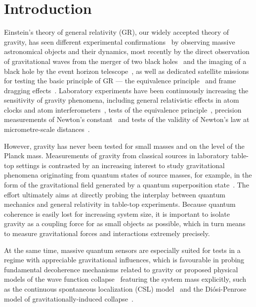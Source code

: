 \documentclass[pdflatex,sn-mathphys]{sn-jnl}
\begin{document}
\section{Introduction}\label{sec1}
    Einstein’s theory of general relativity (GR), our widely accepted theory of gravity, has seen different experimental confirmations~\cite{Einstein1916,walsh1979} by observing massive astronomical objects and their dynamics, most recently by the direct observation of gravitational waves from the merger of two black holes~\cite{abbott2016} and the imaging of a black hole by the event horizon telescope~\cite{akiyama2019}, as well as dedicated satellite missions for testing the basic principle of GR --- the equivalence principle~\cite{touboul2017} and frame dragging effects~\cite{everitt2011}. Laboratory experiments have been continuously increasing the sensitivity of gravity phenomena, including general relativistic effects in atom clocks and atom interferometers~\cite{bothwell2022,asenbaum2017}, tests of the equivalence principle~\cite{rosi2017,asenbaum2020}, precision measurements of Newton's constant~\cite{rosi2014,quinn2013} and tests of the validity of Newton's law at micrometre-scale distances~\cite{geraci2008,tan2020}. 
    
    However, gravity has never been tested for small masses and on the level of the Planck mass. Measurements of gravity from classical sources in laboratory table-top settings is contrasted by an increasing interest to study gravitational phenomena originating from quantum states of source masses, for example, in the form of the gravitational field generated by a quantum superposition state~\cite{bronstein2012republication,rickles2011role,bose2017,marletto2017,al2018optomechanical}. The effort ultimately aims at directly probing the interplay between quantum mechanics and general relativity in table-top experiments. Because quantum coherence is easily lost for increasing system size, it is important to isolate gravity as a coupling force for as small objects as possible, which in turn means to measure gravitational forces and interactions extremely precisely. 

    At the same time, massive quantum sensors are especially suited for tests in a regime with appreciable gravitational influences, which is favourable in probing fundamental decoherence mechanisms related to gravity \cite{R1,R2} or proposed  physical models of the wave function collapse~\cite{diosi2015,vinante2016,bassi2013} featuring the system mass explicitly, such as the continuous spontaneous localization (CSL) model~\cite{ghirardi1990} and the Di\'{o}si-Penrose model of gravitationally-induced collapse~\cite{diosi1987,penrose1996,oosterkamp2013}.
    
\end{document}
